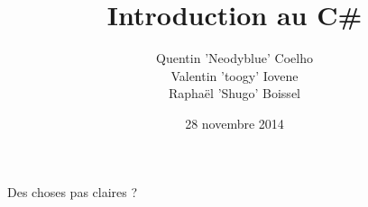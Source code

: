 \documentclass[12pt]{beamer}
\title[Introduction au C\#]{\textbf{Introduction au C\#}}
\author{
  Quentin 'Neodyblue' Coelho\\
  Valentin 'toogy' Iovene\\
  Raphaël 'Shugo' Boissel
}
\date{28 novembre 2014}
\begin{document}
{
}











\begin{frame}[c]
  \begin{center}
    {\Large Des choses pas claires ?}
  \end{center}
\end{frame}
\end{document}
